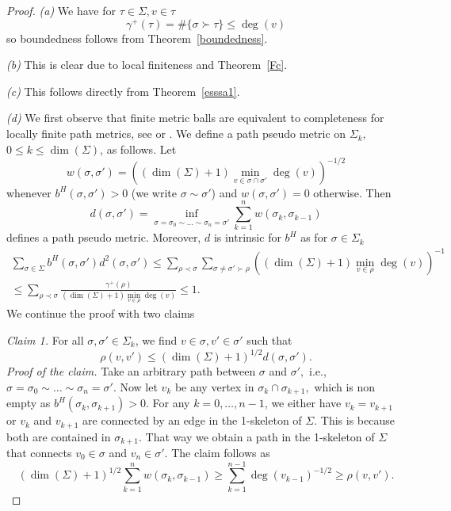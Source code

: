 \documentclass[10pt]{amsart}
\theoremstyle{definition}
\begin{document}
\begin{proof} \emph{(a)} We have  for $\tau\in\Sigma,v\in\tau$
			$$\gamma^{+}(\tau)=\#\{\sigma\succ \tau\} \leq\deg(v)
$$ so boundedness follows from Theorem~\ref{boundedness}.

\emph{(b)} This is clear due to local finiteness and Theorem~\ref{Fc}.

\emph{(c)} This follows directly from Theorem~\ref{esssa1}.

\emph{(d)} We first observe that  finite metric balls are equivalent to completeness for locally finite path metrics, see \cite[Theorem~11.16]{KLW} or \cite[Theorem~2.1.]{KM}.
We define a path pseudo metric on $\Sigma_k,$ $0\leq k\leq\dim(\Sigma)$, as follows. Let $$w(\sigma,\sigma') = ((\dim(\Sigma)+1)\min_{v\in\sigma\cap\sigma'}\deg(v))^{-1/2}$$ whenever $b^H(\sigma,\sigma')>0$ (we  write $\sigma\sim\sigma'$) and $w(\sigma,\sigma') = 0$ otherwise. Then 
$$d(\sigma,\sigma') =\inf_{\sigma=\sigma_{0}\sim\ldots\sim \sigma_{n}=\sigma'}\sum_{k=1}^{n}w(\sigma_k,\sigma_{k-1}) $$
defines a path pseudo metric. Moreover, $d$ is intrinsic for $b^H$ as for $\sigma\in\Sigma_k$
\begin{multline*}
    \sum_{\sigma\in \Sigma} b^H(\sigma,\sigma')d^2(\sigma,\sigma')\leq \sum_{\rho\prec\sigma}\sum_{\sigma\neq\sigma'\succ\rho}((\dim(\Sigma)+1)\min_{v\in\rho}\deg(v))^{-1} \\\leq\sum_{\rho\prec\sigma}\frac{\gamma^+(\rho)}{(\dim(\Sigma)+1)\min_{v\in\rho}\deg(v)}\leq 1.
\end{multline*}
We continue the proof with two claims

\emph{Claim 1.} For all $\sigma,\sigma'\in\Sigma_k$, we find $v\in\sigma,v'\in\sigma'$ such that%
$$\rho(v,v')\leq  (\dim(\Sigma)+1)^{1/2} d(\sigma,\sigma').$$ 
\emph{Proof of the claim.}
Take an arbitrary path between $\sigma$ and $\sigma',$ i.e., $\sigma = \sigma_{0}\sim\ldots\sim\sigma_n = \sigma'.$ Now let $v_k$ be any vertex in $\sigma_k\cap\sigma_{k+1},$ which is non empty as $b^H(\sigma_k,\sigma_{k+1})>0.$ For any $k = 0,\ldots,n-1$, we either have $v_k = v_{k+1}$ or $v_k$ and $v_{k+1}$ are connected by an edge in the 1-skeleton of $\Sigma.$ This is because both are contained in $\sigma_{k+1}.$ That way we obtain a path in the 1-skeleton of $\Sigma$ that connects $v_0\in\sigma$ and $v_n\in\sigma'.$ The claim follows as 
$$(\dim(\Sigma)+1)^{1/2}\sum_{k=1}^{n}w(\sigma_k,\sigma_{k-1})\geq\sum_{k=1}^{n-1}\deg(v_{k-1})^{-1/2}\geq \rho(v,v').$$



\end{proof}
\end{document}
